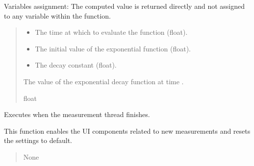 \documentclass[letterpaper,10pt,english]{sphinxmanual}
\begin{document}
\begin{fulllineitems}
\begin{fulllineitems}
\sphinxAtStartPar
Variables assignment:
\sphinxhyphen{} The computed value is returned directly and not assigned to any variable within the function.
\begin{quote}\begin{description}
\begin{itemize}
\item {} 
\sphinxAtStartPar
{} \textendash{} The time at which to evaluate the function (float).

\item {} 
\sphinxAtStartPar
{} \textendash{} The initial value of the exponential function (float).

\item {} 
\sphinxAtStartPar
{} \textendash{} The decay constant (float).

\end{itemize}

\sphinxAtStartPar
The value of the exponential decay function at time .

\sphinxAtStartPar
float

\end{description}\end{quote}

\end{fulllineitems}


\begin{fulllineitems}
\label{\detokenize{FLIMGraphics:FLIMGraphics.FLIMGraphic.finishedThreadMeasurement}}
\pysigstartsignatures
{}
\pysigstopsignatures
\sphinxAtStartPar
Executes when the measurement thread finishes.

\sphinxAtStartPar
This function enables the UI components related to new measurements 
and resets the settings to default.
\begin{quote}\begin{description}
\sphinxAtStartPar
None

\end{description}\end{quote}


\end{fulllineitems}
\end{fulllineitems}
\end{document}
